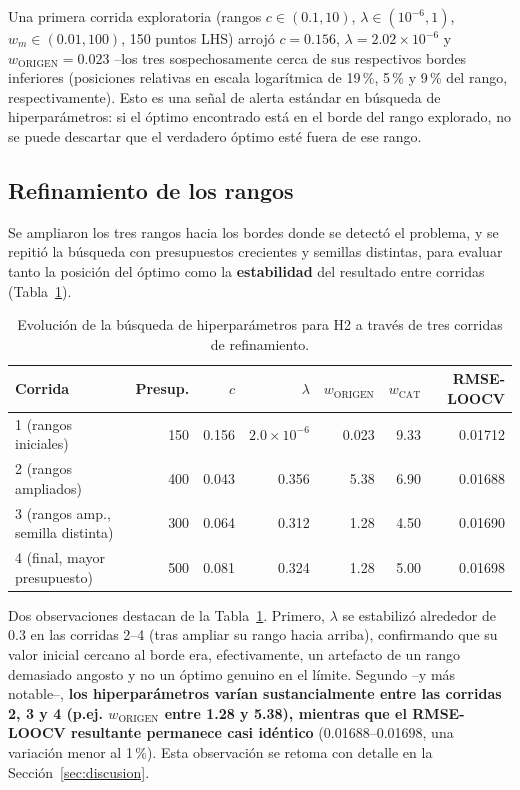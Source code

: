 \documentclass[11pt,a4paper]{article}
\begin{document}
Una primera corrida exploratoria (rangos $c\in(0.1,10)$, $\lambda\in(10^{-6},1)$,
$w_m\in(0.01,100)$, 150 puntos LHS) arroj\'o $c=0.156$, $\lambda=2.02\times10^{-6}$
y $w_{\text{ORIGEN}}=0.023$ --los tres sospechosamente cerca de sus respectivos
bordes inferiores (posiciones relativas en escala logar\'itmica de 19\,\%,
5\,\% y 9\,\% del rango, respectivamente). Esto es una se\~nal de alerta
est\'andar en b\'usqueda de hiperpar\'ametros: si el \'optimo encontrado est\'a
en el borde del rango explorado, no se puede descartar que el verdadero
\'optimo est\'e fuera de ese rango.

\subsection{Refinamiento de los rangos}

Se ampliaron los tres rangos hacia los bordes donde se detect\'o el problema,
y se repiti\'o la b\'usqueda con presupuestos crecientes y semillas distintas,
para evaluar tanto la posici\'on del \'optimo como la \textbf{estabilidad}
del resultado entre corridas (Tabla~\ref{tab:refinamiento}).

\begin{table}[htbp]
\centering
\caption{Evoluci\'on de la b\'usqueda de hiperpar\'ametros para H2 a trav\'es
de tres corridas de refinamiento.}
\label{tab:refinamiento}
\small
\begin{tabular}{@{}lrrrrrr@{}}
\toprule
Corrida & Presup. & $c$ & $\lambda$ & $w_{\text{ORIGEN}}$ & $w_{\text{CAT}}$ & RMSE-LOOCV \\
\midrule
1 (rangos iniciales)     & 150 & 0.156  & $2.0\times10^{-6}$ & 0.023 & 9.33 & 0.01712 \\
2 (rangos ampliados)     & 400 & 0.043  & 0.356              & 5.38  & 6.90 & 0.01688 \\
3 (rangos amp., semilla distinta) & 300 & 0.064  & 0.312     & 1.28  & 4.50 & 0.01690 \\
4 (final, mayor presupuesto)      & 500 & 0.081  & 0.324     & 1.28  & 5.00 & 0.01698 \\
\bottomrule
\end{tabular}
\end{table}

Dos observaciones destacan de la Tabla~\ref{tab:refinamiento}. Primero,
$\lambda$ se estabiliz\'o alrededor de $0.3$ en las corridas 2--4 (tras
ampliar su rango hacia arriba), confirmando que su valor inicial cercano al
borde era, efectivamente, un artefacto de un rango demasiado angosto y no un
\'optimo genuino en el l\'imite. Segundo --y m\'as notable--, \textbf{los
hiperpar\'ametros var\'ian sustancialmente entre las corridas 2, 3 y 4 (p.ej.
$w_{\text{ORIGEN}}$ entre 1.28 y 5.38), mientras que el RMSE-LOOCV resultante
permanece casi id\'entico} (0.01688--0.01698, una variaci\'on menor al 1\,\%).
Esta observaci\'on se retoma con detalle en la Secci\'on~\ref{sec:discusion}.
\end{document}
